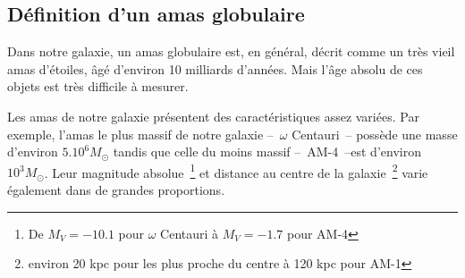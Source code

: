 		\subsection{Définition d'un amas globulaire}
			Dans notre galaxie, un amas globulaire est, en général, décrit comme un
			très vieil amas d'étoiles, âgé d'environ 10 milliards d'années. Mais
			l'âge absolu de ces objets est très difficile à mesurer.

			Les amas de notre galaxie présentent des caractéristiques assez
			variées. Par exemple, l'amas le plus massif de notre galaxie
			--~$\omega$ Centauri~-- possède une masse d'environ $5.10^6 M_\odot$
			tandis que celle du moins massif --~AM-4~--est d'environ $10^3
			M_\odot$. Leur magnitude absolue~\footnote{De $M_V = -10.1$ pour
			$\omega$ Centauri à $M_V = -1.7$ pour AM-4} et distance au centre de la
			galaxie~\footnote{environ 20 kpc pour les plus proche du centre à 120
			kpc pour AM-1} varie également dans de grandes proportions.



